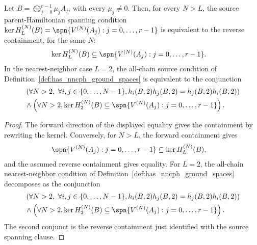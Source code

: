 \begin{lemma}
    \label{lem:block_diagonal_parent_spanning_reverse_inclusion}
    \leanok
    Let $B=\bigoplus_{j=0}^{r-1}\mu_jA_j$, with every $\mu_j\ne0$. Then, for
    every $N>L$, the source parent-Hamiltonian spanning condition
    $\ker H_L^{(N)}(B) =\spn\{V^{(N)}(A_j):j=0,\ldots,r-1\}$
    is equivalent to the reverse containment, for the same $N$:
    \begin{align}
        \ker H_L^{(N)}(B)
         & \subseteq
        \spn\{V^{(N)}(A_j):j=0,\ldots,r-1\}. \notag
    \end{align}
    In the nearest-neighbor case $L=2$, the all-chain source condition of
    Definition~\ref{def:has_nncph_ground_spaces} is equivalent to the
    conjunction
    \begin{align}
         & \left(\forall N>2,\ \forall i,j\in\{0,\ldots,N-1\},
        h_i(B,2)h_j(B,2)=h_j(B,2)h_i(B,2)\right) \notag        \\
         & {}\land
        \left(\forall N>2,
        \ker H_2^{(N)}(B)
        \subseteq
        \spn\{V^{(N)}(A_j):j=0,\ldots,r-1\}\right). \notag
    \end{align}
\end{lemma}

\begin{proof}
    \leanok
    The forward direction of the displayed equality gives the containment by
    rewriting the kernel. Conversely, for $N>L$, the forward containment gives
    \begin{align}
        \spn\{V^{(N)}(A_j):j=0,\ldots,r-1\}
         & \subseteq
        \ker H_L^{(N)}(B), \notag
    \end{align}
    and the assumed reverse containment gives equality. For $L=2$, the
    all-chain nearest-neighbor condition of
    Definition~\ref{def:has_nncph_ground_spaces} decomposes as the conjunction
    \begin{align}
         & \left(\forall N>2,\ \forall i,j\in\{0,\ldots,N-1\},
        h_i(B,2)h_j(B,2)=h_j(B,2)h_i(B,2)\right) \notag        \\
         & {}\land
        \left(\forall N>2,
        \ker H_2^{(N)}(B)
        \subseteq
        \spn\{V^{(N)}(A_j):j=0,\ldots,r-1\}\right). \notag
    \end{align}
    The second conjunct is the reverse containment just identified with the
    source spanning clause.
\end{proof}

